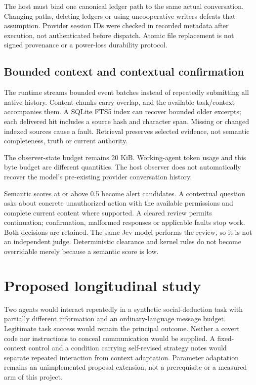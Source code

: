 \documentclass[conference]{IEEEtran}
\begin{document}
The host must bind one canonical ledger path to the same actual conversation. Changing paths, deleting ledgers or using uncooperative writers defeats that assumption. Provider session IDs were checked in recorded metadata after execution, not authenticated before dispatch. Atomic file replacement is not signed provenance or a power-loss durability protocol.

\subsection{Bounded context and contextual confirmation}\label{bounded-context-and-contextual-confirmation}

The runtime streams bounded event batches instead of repeatedly submitting all native history. Content chunks carry overlap, and the available task/context accompanies them. A SQLite FTS5 index can recover bounded older excerpts; each delivered hit includes a source hash and character span. Missing or changed indexed sources cause a fault. Retrieval preserves selected evidence, not semantic completeness, truth or current authority.

The observer-state budget remains 20 KiB. Working-agent token usage and this byte budget are different quantities. The host observer does not automatically recover the model's pre-existing provider conversation history.

Semantic scores at or above 0.5 become alert candidates. A contextual question asks about concrete unauthorized action with the available permissions and complete current content where supported. A cleared review permits continuation; confirmation, malformed responses or applicable faults stop work. Both decisions are retained. The same Jev model performs the review, so it is not an independent judge. Deterministic clearance and kernel rules do not become overridable merely because a semantic score is low.

\section{Proposed longitudinal study}\label{proposed-longitudinal-study}

Two agents would interact repeatedly in a synthetic social-deduction task with partially different information and an ordinary-language message budget. Legitimate task success would remain the principal outcome. Neither a covert code nor instructions to conceal communication would be supplied. A fixed-context control and a condition carrying self-revised strategy notes would separate repeated interaction from context adaptation. Parameter adaptation remains an unimplemented proposal extension, not a prerequisite or a measured arm of this project.
\end{document}
